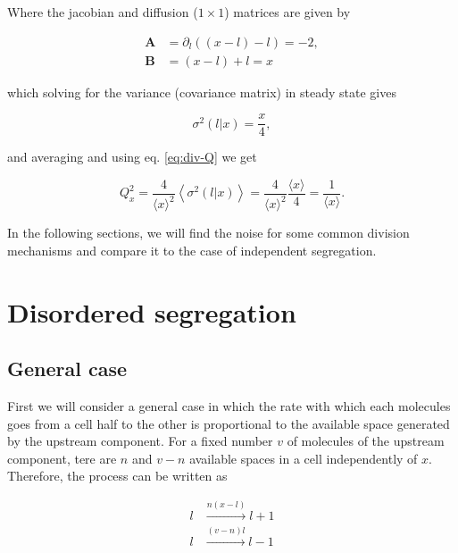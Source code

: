 Where the jacobian and diffusion ($1\times1$) matrices are given by

\begin{equation}
  \begin{split}
    \mathbf{A} &= \partial_l\left((x-l)-l\right) = -2,\\
    \mathbf{B} &= (x-l)+l = x
  \end{split}
\end{equation}

which solving for the variance (covariance matrix) in steady state gives

\begin{equation}
  \label{eq:div-var_ind}
  \sigma^2(l|x) = \frac{x}{4},
\end{equation}

and averaging and using eq. \eqref{eq:div-Q} we get

\begin{equation}
  Q_x^2 = \frac{4}{\langle x\rangle^2}\left\langle\sigma^2(l|x)\right\rangle = \frac{4}{\langle x\rangle^2}\frac{\langle x\rangle}{4} = \frac{1}{\langle x\rangle}.
\end{equation}

In the following sections, we will find the noise for some common division mechanisms and compare it to the case of independent segregation.

\section{Disordered segregation}

\subsection{General case}

First we will consider a general case in which the rate with which each molecules goes from a cell half to the other is proportional to the available space generated by the upstream component. For a fixed number $v$ of molecules of the upstream component, tere are $n$ and $v-n$ available spaces in a cell independently of $x$. Therefore, the process can be written as

\begin{equation}
  \label{eq:div-arr_disg}
  \begin{split}
    l&\xrightarrow{n(x-l)}l+1\\
    l&\xrightarrow{(v-n)l}l-1
  \end{split}
\end{equation}

